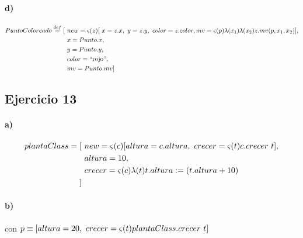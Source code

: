 \documentclass[10pt,a4paper]{article}
\begin{document}
\paragraph{d)}
\begin{align*}
PuntoColoreado \overset{def}{=} [~& new = \varsigma(z)[~x=z.x,~y = z.y,~color=z.color, mv = \varsigma(p)\lambda(x_1)\lambda(x_2) z.mv(p,x_1,x_2)]
, \\
&  x = Punto.x, \\
&  y = Punto.y, \\
&  color = \text{``rojo''}, \\ 
&  mv = Punto.mv ] \\
\end{align*}

\subsection{Ejercicio 13}
\paragraph{a)}
\begin{align*}
plantaClass = [~& new = \varsigma(c)[altura = c.altura,~crecer = \varsigma(t)c.crecer~t], \\
&altura = 10,\\
&crecer = \varsigma(c)\lambda(t)t.altura := (t.altura + 10) \\
]~&\\
\end{align*}

\paragraph{b)}
	\vspace{5mm}
	\begin{center}
		\begin{scprooftree}
		\def\extraVskip{5pt}

    \RightLabel{[Sel]}
		\end{scprooftree}    
	\end{center}

    con $p \equiv [altura = 20,~crecer = \varsigma(t)plantaClass.crecer~t]$
    
\end{document}
